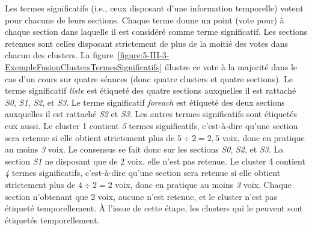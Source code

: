 \bigskip

Les termes significatifs (i.e., ceux disposant d'une information temporelle) \og votent \fg pour chacune de leurs sections.
Chaque terme donne un point (\og vote \fg pour) à chaque section dans laquelle il est considéré comme terme significatif.
Les sections retenues sont celles disposant strictement de plus de la moitié des votes dans chacun des clusters.
La figure~\ref{figure:5-III-3-ExempleFusionClustersTermesSignificatifs} illustre ce vote à la majorité dans le cas d'un cours sur quatre séances (donc quatre clusters et quatre sections).
Le terme significatif \textit{liste} est étiqueté des quatre sections auxquelles il est rattaché \textit{S0}, \textit{S1}, \textit{S2}, et \textit{S3}.
Le terme significatif \textit{foreach} est étiqueté des deux sections auxquelles il est rattaché \textit{S2} et \textit{S3}.
Les autres termes significatifs sont étiquetés eux aussi.
Le cluster 1 contient \textit{5} termes significatifs, c'est-à-dire qu'une section sera retenue si elle obtient strictement plus de $ 5 \div 2 = 2,5 $ voix, donc en pratique au moins \textit{3} voix.
Le consensus se fait donc sur les sections \textit{S0}, \textit{S2}, et \textit{S3}.
La section \textit{S1} ne disposant que de 2 voix, elle n'est pas retenue.
Le cluster 4 contient \textit{4} termes significatifs, c'est-à-dire qu'une section sera retenue si elle obtient strictement plus de $ 4 \div 2 = 2 $ voix, donc en pratique au moins \textit{3} voix.
Chaque section n'obtenant que 2 voix, aucune n'est retenue, et le cluster n'est pas étiqueté temporellement.
À l'issue de cette étape, les clusters qui le peuvent sont étiquetés temporellement.

\newpage

\hspace{0pt}
\vfill

